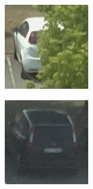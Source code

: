 \begin{figure}
\begin{subfigure}{0.25\columnwidth}
\end{subfigure}%
\begin{subfigure}{0.25\columnwidth}%
\includegraphics[width=\columnwidth]{11busy}%
\end{subfigure}%
\begin{subfigure}{0.25\columnwidth}%
\includegraphics[width=\columnwidth]{13busy}%
\end{subfigure}


\end{figure}
